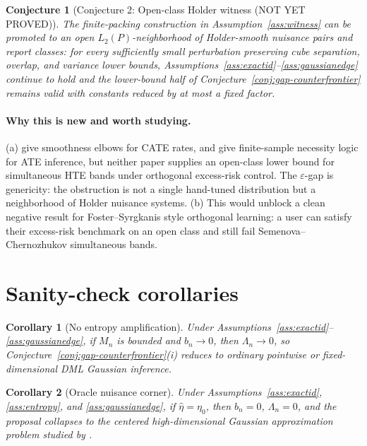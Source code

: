 \documentclass[11pt]{article}
\theoremstyle{definition}
\theoremstyle{plain}
\newtheorem{conjecture}{Conjecture}
\newtheorem{corollary}{Corollary}
\theoremstyle{remark}
\begin{document}
\begin{conjecture}[Conjecture 2: Open-class Holder witness (NOT YET PROVED)]\label{conj:holder-witness}
The finite-packing construction in Assumption~\ref{ass:witness} can be promoted
to an open \(L_2(P)\)-neighborhood of Holder-smooth nuisance pairs and report
classes: for every sufficiently small perturbation preserving cube separation,
overlap, and variance lower bounds, Assumptions~\ref{ass:exactid}--\ref{ass:gaussianedge}
continue to hold and the lower-bound half of
Conjecture~\ref{conj:gap-counterfrontier} remains valid with constants reduced
by at most a fixed factor.
\end{conjecture}

\paragraph{Why this is new and worth studying.}
(a) \citet{KennedyBalakrishnanRobinsWasserman2024MinimaxCATE} give smoothness
elbows for CATE rates, and \citet{ArmstrongKolesar2021FiniteSampleATE} give
finite-sample necessity logic for ATE inference, but neither paper supplies an
open-class lower bound for simultaneous HTE bands under orthogonal excess-risk
control.  The \(\varepsilon\)-gap is genericity: the obstruction is not a
single hand-tuned distribution but a neighborhood of Holder nuisance systems.
(b) This would unblock a clean negative result for Foster--Syrgkanis style
orthogonal learning: a user can satisfy their excess-risk benchmark on an open
class and still fail Semenova--Chernozhukov simultaneous bands.

\section{Sanity-check corollaries}
\begin{corollary}[No entropy amplification]\label{cor:no-entropy}
Under Assumptions~\ref{ass:exactid}--\ref{ass:gaussianedge}, if \(M_n\) is
bounded and \(b_n\to0\), then \(\Lambda_n\to0\), so
Conjecture~\ref{conj:gap-counterfrontier}(i) reduces to ordinary pointwise or
fixed-dimensional DML Gaussian inference.
\end{corollary}

\begin{corollary}[Oracle nuisance corner]\label{cor:oracle}
Under Assumptions~\ref{ass:exactid}, \ref{ass:entropy}, and
\ref{ass:gaussianedge}, if \(\widehat\eta=\eta_0\), then \(b_n=0\),
\(\Lambda_n=0\), and the proposal collapses to the centered high-dimensional
Gaussian approximation problem studied by
\citet{ChernozhukovChetverikovKato2017HDCLT}.
\end{corollary}
\end{document}
